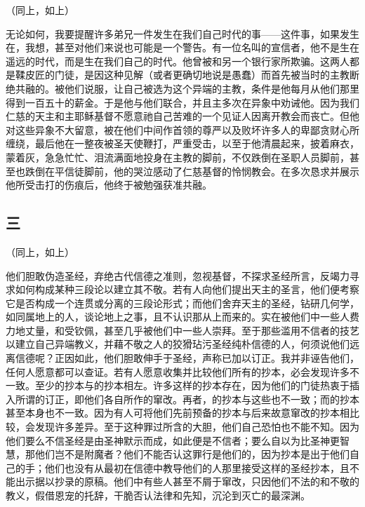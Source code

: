 （同上，如上）\par

无论如何，我要提醒许多弟兄一件发生在我们自己时代的事——这件事，如果发生在，我想，甚至对他们来说也可能是一个警告。有一位名叫的宣信者，他不是生在遥远的时代，而是生在我们自己的时代。他曾被和另一个银行家所欺骗。这两人都是鞣皮匠的门徒，是因这种见解（或者更确切地说是愚蠢）而首先被当时的主教断绝共融的。被他们说服，让自己被选为这个异端的主教，条件是他每月从他们那里得到一百五十的薪金。于是他与他们联合，并且主多次在异象中劝诫他。因为我们仁慈的天主和主耶稣基督不愿意祂自己苦难的一个见证人因离开教会而丧亡。但他对这些异象不大留意，被在他们中间作首领的尊严以及败坏许多人的卑鄙贪财心所缠绕，最后他在一整夜被圣天使鞭打，严重受击，以至于他清晨起来，披着麻衣，蒙着灰，急急忙忙、泪流满面地投身在主教的脚前，不仅跌倒在圣职人员脚前，甚至也跌倒在平信徒脚前，他的哭泣感动了仁慈基督的怜悯教会。在多次恳求并展示他所受击打的伤痕后，他终于被勉强获准共融。\par


\subsection{三}

（同上，如上）\par

他们胆敢伪造圣经，弃绝古代信德之准则，忽视基督，不探求圣经所言，反竭力寻求如何构成某种三段论以建立其不敬。若有人向他们提出天主的圣言，他们便考察它是否构成一个连贯或分离的三段论形式；而他们舍弃天主的圣经，钻研几何学，如同属地上的人，谈论地上之事，且不认识那从上而来的。实在被他们中一些人费力地丈量，和受钦佩，甚至几乎被他们中一些人崇拜。至于那些滥用不信者的技艺以建立自己异端教义，并藉不敬之人的狡猾玷污圣经纯朴信德的人，何须说他们远离信德呢？正因如此，他们胆敢伸手于圣经，声称已加以订正。我并非诬告他们，任何人愿意都可以查证。若有人愿意收集并比较他们所有的抄本，必会发现许多不一致。至少的抄本与的抄本相左。许多这样的抄本存在，因为他们的门徒热衷于插入所谓的订正，即他们各自所作的窜改。再者，的抄本与这些也不一致；而的抄本甚至本身也不一致。因为有人可将他们先前预备的抄本与后来故意窜改的抄本相比较，会发现许多差异。至于这种罪过所含的大胆，他们自己恐怕也不能不知。因为他们要么不信圣经是由圣神默示而成，如此便是不信者；要么自以为比圣神更智慧，那他们岂不是附魔者？他们不能否认这罪行是他们的，因为抄本是出于他们自己的手；他们也没有从最初在信德中教导他们的人那里接受这样的圣经抄本，且不能出示据以抄录的原稿。他们中有些人甚至不屑于窜改，只因他们不法的和不敬的教义，假借恩宠的托辞，干脆否认法律和先知，沉沦到灭亡的最深渊。\par

